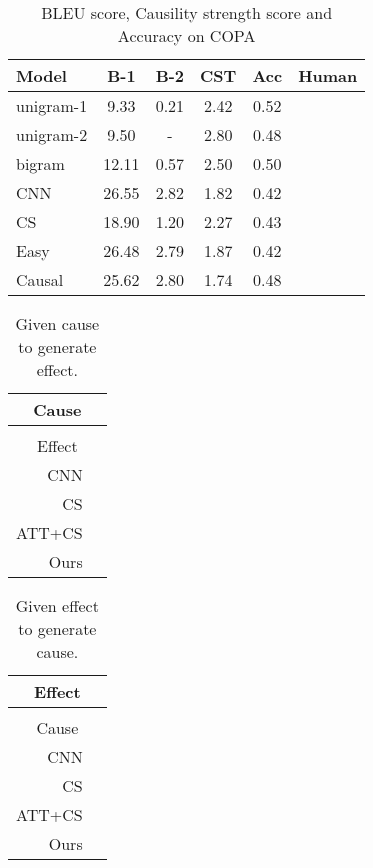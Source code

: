 \begin{table}[th]
	\centering
    \small
	\begin{tabular}{|l|c|c|c|c|c|}
		\hline
		Model &   B-1 & B-2 & CST & Acc & Human\\
		\hline
        unigram-1 & 9.33 & 0.21 & 2.42 & 0.52 & \\
        unigram-2 & 9.50 & -  & 2.80 & 0.48 & \\
        bigram & 12.11 & 0.57 & 2.50 & 0.50 & \\
		\hline
		CNN & 26.55 & 2.82 & 1.82 & 0.42 & \\
		CS & 18.90 & 1.20 & 2.27 & 0.43 & \\
		Easy & 26.48 & 2.79  & 1.87 & 0.42 & \\
		\hline
		Causal & 25.62 & 2.80 & 1.74 & 0.48 & \\
		\hline
	\end{tabular}
	\caption{BLEU score, Causility strength score and Accuracy on COPA}
	\label{tab:copa}
\end{table}

\begin{table*}[th]
    \centering
    \small
    \begin{tabular}{r|l}%
    \hline
    \multicolumn{2}{c}{Cause}\\ 
    \hline
    \multicolumn{2}{c}{}\\ 
    \hline
    \multicolumn{2}{c}{Effect} \\
    \hline
    CNN & \\
    \hline
    CS & \\
    \hline
    ATT+CS & \\
    \hline
    Ours & \\
    \hline
    \end{tabular}
    \caption{Given cause to generate effect.}
    \label{tab:cause_exp}
\end{table*}

\begin{table*}[th]
    \centering
    \small
    \begin{tabular}{r|l}%
    \hline
    \multicolumn{2}{c}{Effect}\\ 
    \hline
    \multicolumn{2}{c}{}\\ 
    \hline
    \multicolumn{2}{c}{Cause} \\
    \hline
    CNN &  \\
    \hline
    CS &  \\
    \hline
    ATT+CS &  \\
    \hline
    Ours &  \\
    \hline
    \end{tabular}
    \caption{Given effect to generate cause.}
    \label{tab:effect_exp}
\end{table*}

